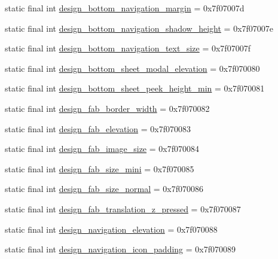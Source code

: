 \begin{CompactItemize}
static final int \hyperlink{classandroid_1_1support_1_1v4_1_1_r_1_1dimen_48f524b8a1b718e8b5f3b1ff495cd5e9}{design\_\-bottom\_\-navigation\_\-margin} = 0x7f07007d
\item 
static final int \hyperlink{classandroid_1_1support_1_1v4_1_1_r_1_1dimen_f85e185d75f742ba20bd1089b57bf118}{design\_\-bottom\_\-navigation\_\-shadow\_\-height} = 0x7f07007e
\item 
static final int \hyperlink{classandroid_1_1support_1_1v4_1_1_r_1_1dimen_51b6184766230161bf285f397755c7c6}{design\_\-bottom\_\-navigation\_\-text\_\-size} = 0x7f07007f
\item 
static final int \hyperlink{classandroid_1_1support_1_1v4_1_1_r_1_1dimen_4d08142ff4a95a4791595b60a6d6d56a}{design\_\-bottom\_\-sheet\_\-modal\_\-elevation} = 0x7f070080
\item 
static final int \hyperlink{classandroid_1_1support_1_1v4_1_1_r_1_1dimen_a1d7e871d0e3c15e6baa1d87d90d9d15}{design\_\-bottom\_\-sheet\_\-peek\_\-height\_\-min} = 0x7f070081
\item 
static final int \hyperlink{classandroid_1_1support_1_1v4_1_1_r_1_1dimen_adc28c412e6a1019e57ee1acd048f0df}{design\_\-fab\_\-border\_\-width} = 0x7f070082
\item 
static final int \hyperlink{classandroid_1_1support_1_1v4_1_1_r_1_1dimen_4d481fc3e14b173eb7c2c0a946a7d314}{design\_\-fab\_\-elevation} = 0x7f070083
\item 
static final int \hyperlink{classandroid_1_1support_1_1v4_1_1_r_1_1dimen_aea2a5f4c088480fc2992016a2de2861}{design\_\-fab\_\-image\_\-size} = 0x7f070084
\item 
static final int \hyperlink{classandroid_1_1support_1_1v4_1_1_r_1_1dimen_2059748c1a805dab77f756eddf600b92}{design\_\-fab\_\-size\_\-mini} = 0x7f070085
\item 
static final int \hyperlink{classandroid_1_1support_1_1v4_1_1_r_1_1dimen_e04d7c2f0430ca5762dd668ea9374857}{design\_\-fab\_\-size\_\-normal} = 0x7f070086
\item 
static final int \hyperlink{classandroid_1_1support_1_1v4_1_1_r_1_1dimen_dc18637ec8df4162ce2d158aba2d4cce}{design\_\-fab\_\-translation\_\-z\_\-pressed} = 0x7f070087
\item 
static final int \hyperlink{classandroid_1_1support_1_1v4_1_1_r_1_1dimen_cbe2e6d088d285d78b7b8696338679e3}{design\_\-navigation\_\-elevation} = 0x7f070088
\item 
static final int \hyperlink{classandroid_1_1support_1_1v4_1_1_r_1_1dimen_72603d6d9e559390dea2745475131ce6}{design\_\-navigation\_\-icon\_\-padding} = 0x7f070089

\end{CompactItemize}
